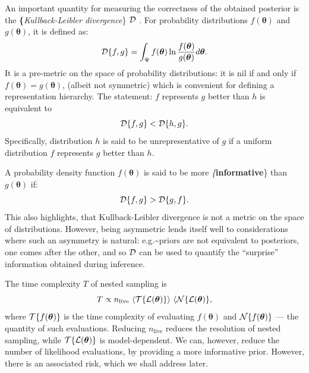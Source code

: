 \documentclass[draft,usenatbib]{mnras}
\begin{document}
An important quantity for measuring the correctness of the obtained
posterior is the \textbf\{\emph{Kullback-Leibler divergence}\} \({\cal
   D}\) \citep{Kullback_1951}. For probability distributions
\(f(\bm{\theta})\) and \(g(\bm{\theta})\), it is defined as:
\begin{equation}
\label{eq:kl-def}
 {\cal D}\{f, g \} = \int_{\Psi}f(\bm{\theta}) \ln \frac{f(\bm{\theta})}{g(\bm{\theta})} d \bm{\theta}.
\end{equation}
It is a pre-metric on the space of probability distributions: it is
nil if and only if \(f(\bm{\theta}) = g(\bm{\theta})\), (albeit not
symmetric) which is convenient for defining a representation
hierarchy. The statement: \(f\) represents \(g\) better than \(h\) is
equivalent to
\begin{equation}
\label{eq:hierarchy}
{\cal D}\{f, g\} < {\cal D}\{h, g\}.
\end{equation}
Specifically, distribution \(h\) is said to be unrepresentative of \(g\)
if a uniform distribution \(f\) represents \(g\) better than \(h\).

A probability density function \(f(\bm{\theta})\) is said to be
more \emph\{\textbf{informative}\} than \(g(\bm{\theta})\) if:
\begin{equation}
\label{eq:informative}
{\cal D}\{ f, g \} > {\cal D}\{ g, f\}.
\end{equation}
This also highlights, that Kullback-Leibler divergence is not a
metric on the space of distributions. However, being asymmetric
lends itself well to considerations where such an asymmetry is
natural: e.g.\textasciitilde{}priors are not equivalent to posteriors, one comes
after the other, and so \({\cal D}\) can be used to quantify the
``surprise'' information obtained during inference.

The time complexity \(T\) of nested sampling is
\begin{equation}\label{eq:complexity}
T \propto  n_\text{live}\  \langle {\cal T}\{{\cal L}(\bm{\theta})\} \rangle \ \langle  {\cal N}\{{\cal L}(\bm{\theta}) \},
\end{equation}
where \({\cal T}\{f(\bm{\theta})\}\) is the time complexity of
evaluating \(f(\bm{\theta})\) and \({\cal N}\{f(\bm{\theta})\}\) ---
the quantity of such evaluations. Reducing \(n_\text{live}\) reduces
the resolution of nested sampling, while \({\cal T}\{{\cal
   L}(\bm{\theta})\}\) is model-dependent. We can, however, reduce the
number of likelihood evaluations, by providing a more informative
prior. However, there is an associated risk, which we shall address
later.
\end{document}
